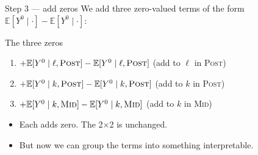 \documentclass[aspectratio=169,11pt]{beamer}
\begin{document}
\begin{frame}{Step 3 --- add zeros}
\vspace{0.4em}
We add three zero-valued terms of the form $\mathbb{E}[Y^0 \mid \cdot] - \mathbb{E}[Y^0 \mid \cdot]$:

\vspace{0.4em}
\begin{block}{The three zeros}
\small
\begin{enumerate}
  \item $+\mathbb{E}[Y^0 \mid \ell, \textsc{Post}] - \mathbb{E}[Y^0 \mid \ell, \textsc{Post}]$ \quad (add to $\ell$ in \textsc{Post})
  \item $+\mathbb{E}[Y^0 \mid k, \textsc{Post}] - \mathbb{E}[Y^0 \mid k, \textsc{Post}]$ \quad (add to $k$ in \textsc{Post})
  \item $+\mathbb{E}[Y^0 \mid k, \textsc{Mid}]  - \mathbb{E}[Y^0 \mid k, \textsc{Mid}]$  \quad (add to $k$ in \textsc{Mid})
\end{enumerate}
\end{block}

\vspace{0.5em}
\begin{itemize}\small
  \item Each adds zero. \;The 2$\times$2 is unchanged.
  \item But now we can group the terms into something interpretable.
\end{itemize}
\end{frame}
\end{document}
